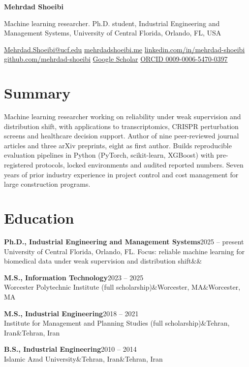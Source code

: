 \documentclass[10pt,letterpaper]{article}
\newcommand{\entry}[4]{%
  {\bfseries #1}\hfill{\color{muted}#2}\\
  {#3}\ifx&#4&\else\hfill{\color{muted}#4}\fi\par\vspace{1pt}}
\begin{document}
{\LARGE\bfseries\color{navy}Mehrdad Shoeibi}\par\vspace{2pt}
Machine learning researcher. Ph.D. student, Industrial Engineering and Management Systems, University of Central Florida, Orlando, FL, USA\par\vspace{2pt}
{\color{muted}
\href{mailto:Mehrdad.Shoeibi@ucf.edu}{Mehrdad.Shoeibi@ucf.edu} \textbar{}
\href{https://mehrdadshoeibi.me}{mehrdadshoeibi.me} \textbar{}
\href{https://www.linkedin.com/in/mehrdad-shoeibi/}{linkedin.com/in/mehrdad-shoeibi} \textbar{}
\href{https://github.com/mehrdad-shoeibi}{github.com/mehrdad-shoeibi} \textbar{}
\href{https://scholar.google.com/citations?user=1M23aUoAAAAJ&hl=en}{Google Scholar} \textbar{}
\href{https://orcid.org/0009-0006-5470-0397}{ORCID 0009-0006-5470-0397}}

\section{Summary}
Machine learning researcher working on reliability under weak supervision and distribution shift, with applications to transcriptomics, CRISPR perturbation screens and healthcare decision support. Author of nine peer-reviewed journal articles and three arXiv preprints, eight as first author. Builds reproducible evaluation pipelines in Python (PyTorch, scikit-learn, XGBoost) with pre-registered protocols, locked environments and audited reported numbers. Seven years of prior industry experience in project control and cost management for large construction programs.

\section{Education}
\entry{Ph.D., Industrial Engineering and Management Systems}{2025 -- present}{University of Central Florida, Orlando, FL. Focus: reliable machine learning for biomedical data under weak supervision and distribution shift}{}
\vspace{2pt}
\entry{M.S., Information Technology}{2023 -- 2025}{Worcester Polytechnic Institute (full scholarship)}{Worcester, MA}
\vspace{2pt}
\entry{M.S., Industrial Engineering}{2018 -- 2021}{Institute for Management and Planning Studies (full scholarship)}{Tehran, Iran}
\vspace{2pt}
\entry{B.S., Industrial Engineering}{2010 -- 2014}{Islamic Azad University}{Tehran, Iran}
\end{document}
